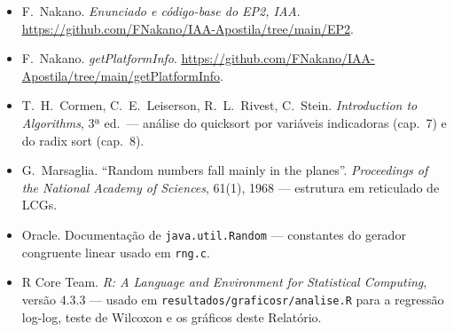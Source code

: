 \documentclass[11pt,a4paper]{article}
\newcommand{\segurl}[1]{\underline{\vphantom{Ag}#1}\hspace{0pt}}
\newcommand{\urlPlatformInfo}{\href{https://github.com/FNakano/IAA-Apostila/tree/main/getPlatformInfo}{\ttfamily\color{linkblue}\segurl{https://github.com/}\allowbreak\segurl{FNakano/}\allowbreak\segurl{IAA-Apostila/}\allowbreak\segurl{tree/}\allowbreak\segurl{main/}\allowbreak\segurl{getPlatformInfo}}}
\newcommand{\urlRepoEP}{\href{https://github.com/FNakano/IAA-Apostila/tree/main/EP2}{\ttfamily\color{linkblue}\segurl{https://github.com/}\allowbreak\segurl{FNakano/}\allowbreak\segurl{IAA-Apostila/}\allowbreak\segurl{tree/}\allowbreak\segurl{main/}\allowbreak\segurl{EP2}}}
\newcommand{\barra}{/\allowbreak}
\renewcommand{\_}{\underscoreoriginal\allowbreak}
\begin{document}
\begin{itemize}
  \item F.~Nakano. \emph{Enunciado e código-base do EP2, IAA}.
    \urlRepoEP.
  \item F.~Nakano. \emph{getPlatformInfo}.
    \urlPlatformInfo.
  \item T.~H.~Cormen, C.~E.~Leiserson, R.~L.~Rivest, C.~Stein.
    \emph{Introduction to Algorithms}, 3ª ed.\ --- análise do quicksort
    por variáveis indicadoras (cap.~7) e do radix sort (cap.~8).
  \item G.~Marsaglia. ``Random numbers fall mainly in the planes''.
    \emph{Proceedings of the National Academy of Sciences}, 61(1), 1968
    --- estrutura em reticulado de LCGs.
  \item Oracle. Documentação de \texttt{java.util.Random} --- constantes
    do gerador congruente linear usado em \texttt{rng.c}.
  \item R Core Team. \emph{R: A Language and Environment for Statistical
    Computing}, versão 4.3.3 --- usado em
    \texttt{resultados\barra{}graficos\_r\barra{}analise.R} para a
    regressão log-log, teste de Wilcoxon e os gráficos deste Relatório.
\end{itemize}
\end{document}
